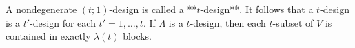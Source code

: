 A nondegenerate $(t; 1)$-design is called a **$t$-design**. It follows that a $t$-design is a $t'$-design for each $t' = 1, \ldots, t$. If $\Lambda$ is a $t$-design, then each $t$-subset of $V$ is contained in exactly $\lambda(t)$ blocks.
